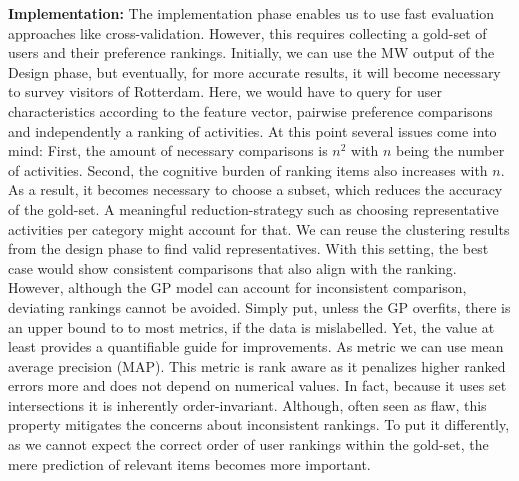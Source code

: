 \documentclass[11pt,a4paper,oneside]{article}
\begin{document}
\textbf{Implementation:} 
The implementation phase enables us to use fast evaluation approaches like cross-validation. However, this requires collecting a gold-set of users and their preference rankings. Initially, we can use the MW output of the Design phase, but eventually, for more accurate results, it will become necessary to survey visitors of Rotterdam. Here, we would have to query for user characteristics according to the feature vector, pairwise preference comparisons and independently a ranking of activities. At this point several issues come into mind: First, the amount of necessary comparisons is $n^2$ with $n$ being the number of activities. Second, the cognitive burden of ranking items also increases with $n$. As a result, it becomes necessary to choose a subset, which reduces the accuracy of the gold-set. A meaningful reduction-strategy such as choosing representative activities per category might account for that. We can reuse the clustering results from the design phase to find valid representatives. With this setting, the best case would show consistent comparisons that also align with the ranking. However, although the GP model can account for inconsistent comparison, deviating rankings cannot be avoided. Simply put, unless the GP overfits, there is an upper bound to to most metrics, if the data is mislabelled. Yet, the value at least provides a quantifiable guide for improvements. As metric we can use mean average precision (MAP).\cite{CITE} This metric is rank aware as it penalizes higher ranked errors more and does not depend on numerical values. In fact, because it uses set intersections it is inherently order-invariant. Although, often seen as flaw, this property mitigates the concerns about inconsistent rankings. To put it differently, as we cannot expect the correct order of user rankings within the gold-set, the mere prediction of relevant items becomes more important.  
\clearpage 
\printbibliography
\end{document}
